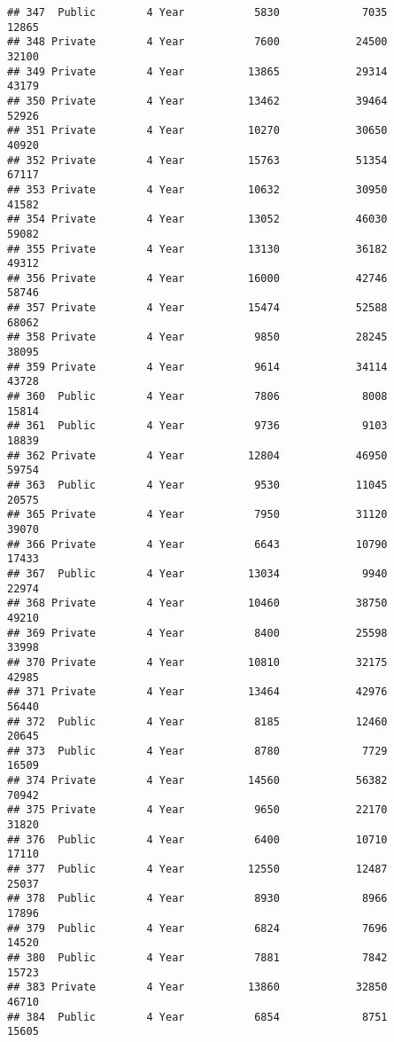 \documentclass[
]{article}
\begin{document}
\begin{verbatim}
## 347  Public        4 Year           5830             7035          12865
## 348 Private        4 Year           7600            24500          32100
## 349 Private        4 Year          13865            29314          43179
## 350 Private        4 Year          13462            39464          52926
## 351 Private        4 Year          10270            30650          40920
## 352 Private        4 Year          15763            51354          67117
## 353 Private        4 Year          10632            30950          41582
## 354 Private        4 Year          13052            46030          59082
## 355 Private        4 Year          13130            36182          49312
## 356 Private        4 Year          16000            42746          58746
## 357 Private        4 Year          15474            52588          68062
## 358 Private        4 Year           9850            28245          38095
## 359 Private        4 Year           9614            34114          43728
## 360  Public        4 Year           7806             8008          15814
## 361  Public        4 Year           9736             9103          18839
## 362 Private        4 Year          12804            46950          59754
## 363  Public        4 Year           9530            11045          20575
## 365 Private        4 Year           7950            31120          39070
## 366 Private        4 Year           6643            10790          17433
## 367  Public        4 Year          13034             9940          22974
## 368 Private        4 Year          10460            38750          49210
## 369 Private        4 Year           8400            25598          33998
## 370 Private        4 Year          10810            32175          42985
## 371 Private        4 Year          13464            42976          56440
## 372  Public        4 Year           8185            12460          20645
## 373  Public        4 Year           8780             7729          16509
## 374 Private        4 Year          14560            56382          70942
## 375 Private        4 Year           9650            22170          31820
## 376  Public        4 Year           6400            10710          17110
## 377  Public        4 Year          12550            12487          25037
## 378  Public        4 Year           8930             8966          17896
## 379  Public        4 Year           6824             7696          14520
## 380  Public        4 Year           7881             7842          15723
## 383 Private        4 Year          13860            32850          46710
## 384  Public        4 Year           6854             8751          15605

\end{verbatim}
\end{document}

